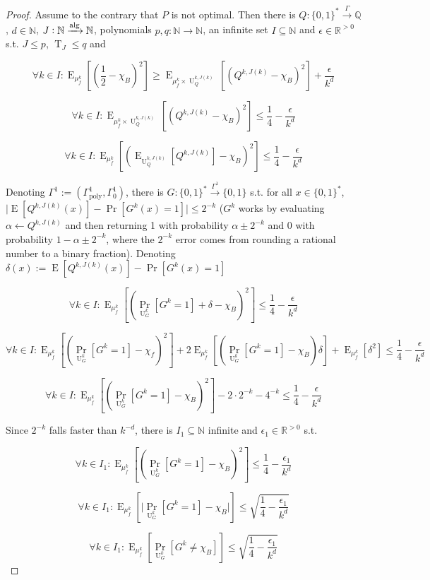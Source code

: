 \documentclass{article}
\numberwithin{equation}{section}
\theoremstyle{definition}
\theoremstyle{plain}
\newcommand{\Bool}{\{0,1\}}
\newcommand{\Words}{{\Bool^*}}
\DeclareMathOperator{\Prb}{Pr}
\DeclareMathOperator{\E}{E}
\DeclareMathOperator{\T}{T}
\DeclareMathOperator{\U}{U}
\newcommand{\Nats}{\mathbb{N}}
\newcommand{\Rats}{\mathbb{Q}}
\newcommand{\Reals}{\mathbb{R}}
\newcommand{\Abs}[1]{\lvert #1 \rvert}
\newcommand{\Alg}{\xrightarrow{\textnormal{alg}}}
\newcommand{\Scheme}{\xrightarrow{\Gamma}}
\begin{document}
\begin{proof}

Assume to the contrary that $P$ is not optimal. Then there is ${Q: \Words \Scheme \Rats}$, $d \in \Nats$, $J: \Nats \Alg \Nats$, polynomials $p,q: \Nats \rightarrow \Nats$, an infinite set ${I \subseteq \Nats}$ and $\epsilon \in \Reals^{>0}$ s.t. $J \leq p$, $\T_J \leq q$ and

$$ \forall k \in I: \E_{\mu_f^k}[(\frac{1}{2}-\chi_B)^2] \geq \E_{\mu_f^k \times \U_Q^{k,J(k)}}[(Q^{k,J(k)}-\chi_B)^2] +\frac{\epsilon}{k^d}$$

$$ \forall k \in I: \E_{\mu_f^k \times \U_Q^{k,J(k)}}[(Q^{k,J(k)}-\chi_B)^2] \leq \frac{1}{4} - \frac{\epsilon}{k^d} $$

$$ \forall k \in I: \E_{\mu_f^k}[(\E_{\U_Q^{k,J(k)}}[Q^{k,J(k)}]-\chi_B)^2] \leq \frac{1}{4} - \frac{\epsilon}{k^d} $$

Denoting $\Gamma^1:=(\Gamma_{\text{poly}}^1,\Gamma_0^1)$, there is $G: \Words \xrightarrow{\Gamma^1} \Bool$ s.t. for all ${x \in \Words}$, ${\Abs{\E[Q^{k,J(k)}(x)]-\Pr[G^k(x)=1]}\leq 2^{-k}}$ ($G^k$ works by evaluating ${\alpha \leftarrow Q^{k,J(k)}}$ and then returning 1 with probability $\alpha \pm 2^{-k}$ and 0 with probability $1-\alpha \pm 2^{-k}$, where the $2^{-k}$ error comes from rounding a rational number to a binary fraction). Denoting $\delta(x):=\E[Q^{k,J(k)}(x)]-\Pr[G^k(x)=1]$

$$ \forall k \in I: \E_{\mu_f^k}[(\Prb_{\U_G^k}[G^k=1]+\delta-\chi_B)^2] \leq \frac{1}{4} - \frac{\epsilon}{k^d} $$

$$ \forall k \in I: \E_{\mu_f^k}[(\Prb_{\U_G^k}[G^k=1]-\chi_f)^2]+2 \E_{\mu_f^k}[(\Prb_{\U_G^k}[G^k=1]-\chi_B)\delta]+\E_{\mu_f^k}[\delta^2] \leq \frac{1}{4} - \frac{\epsilon}{k^d}$$

$$ \forall k \in I: \E_{\mu_f^k}[(\Prb_{\U_G^k}[G^k=1]-\chi_B)^2]-2 \cdot 2^{-k}- 4^{-k} \leq \frac{1}{4} - \frac{\epsilon}{k^d}$$

Since $2^{-k}$ falls faster than $k^{-d}$, there is $I_1 \subseteq \Nats$ infinite and $\epsilon_1 \in \Reals^{>0}$ s.t.

$$ \forall k \in I_1: \E_{\mu_f^k}[(\Prb_{\U_G^k}[G^k=1]-\chi_B)^2] \leq \frac{1}{4} - \frac{\epsilon_1}{k^d}$$

$$ \forall k \in I_1: \E_{\mu_f^k}[\Abs{\Prb_{\U_G^k}[G^k=1]-\chi_B}] \leq \sqrt{\frac{1}{4} - \frac{\epsilon_1}{k^d}} $$

$$ \forall k \in I_1: \E_{\mu_f^k}[\Prb_{\U_G^k}[G^k \ne \chi_B]] \leq \sqrt{\frac{1}{4} - \frac{\epsilon_1}{k^d}} $$


\end{proof}
\end{document}
